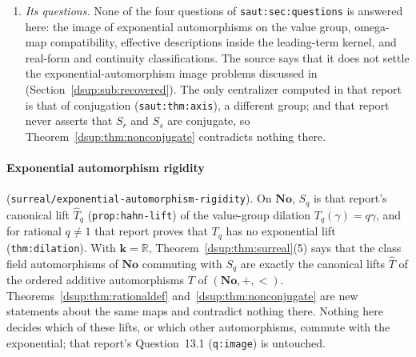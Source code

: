 \documentclass[11pt,oneside]{article}
\numberwithin{equation}{section}
\theoremstyle{definition}
\theoremstyle{remark}
\newcommand{\No}{\mathbf{No}}
\newcommand{\R}{\mathbb R}
\newcommand{\C}{\mathbb C}
\newcommand{\kk}{\mathbf k}
\newcommand{\repo}[1]{\nolinkurl{#1}}%
\newcommand{\lbl}[1]{\nolinkurl{#1}}%
\begin{document}
\begin{enumerate}[leftmargin=*,itemsep=3pt]
Theorem~\ref{dsup:thm:surreal}(4) show that after adding the single
automorphism $S_q$ the coefficient field, the monomials, every coefficient
and the valuation ring become parameter-free definable. The expansion is a
different structure, so the two results are complementary. On $\No(i)$ the
real axis $\No$ is still not claimed definable, and the centralizer
contains every automorphism of $\C$ (Section~\ref{dsup:sub:recovered}).
\item \emph{Its questions.} None of the four questions of
\lbl{saut:sec:questions} is answered here: the image of exponential
automorphisms on the value group, omega-map compatibility, effective
descriptions inside the leading-term kernel, and real-form and continuity
classifications. The source says that it does not settle the
exponential-automorphism image problems discussed in \cite{KKS,RepoAut}
(Section~\ref{dsup:sub:recovered}). The only centralizer computed in that
report is that of conjugation (\lbl{saut:thm:axis}), a different group; and
that report never asserts that $S_r$ and $S_s$ are conjugate, so
Theorem~\ref{dsup:thm:nonconjugate} contradicts nothing there.
\end{enumerate}

\paragraph{Exponential automorphism rigidity}
(\repo{surreal/exponential-automorphism-rigidity}). On $\No$, $S_q$ is that
report's canonical lift $\widehat T_q$ (\lbl{prop:hahn-lift}) of the
value-group dilation $T_q(\gamma)=q\gamma$, and for rational $q\ne1$ that
report proves that $T_q$ has no exponential lift (\lbl{thm:dilation}). With
$\kk=\R$, Theorem~\ref{dsup:thm:surreal}(5) says that the class field
automorphisms of $\No$ commuting with $S_q$ are exactly the canonical lifts
$\widehat T$ of the ordered additive automorphisms $T$ of $(\No,+,<)$.
Theorems~\ref{dsup:thm:rationaldef} and~\ref{dsup:thm:nonconjugate} are new
statements about the same maps and contradict nothing there. Nothing here
decides which of these lifts, or which other automorphisms, commute with
the exponential; that report's Question~13.1 (\lbl{q:image}) is untouched.
\end{document}

